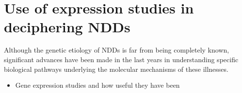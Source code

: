\documentclass[12pt]{article}
\begin{document}
    \section{Use of expression studies in deciphering NDDs}
    Although the genetic etiology of NDDs is far from being completely known, significant advances have been made in the last years in understanding specific biological pathways underlying the molecular mechanisms of these illnesses. 
    \begin{itemize}
        \item Gene expression studies and how useful they have been 
    \end{itemize}
\end{document}
